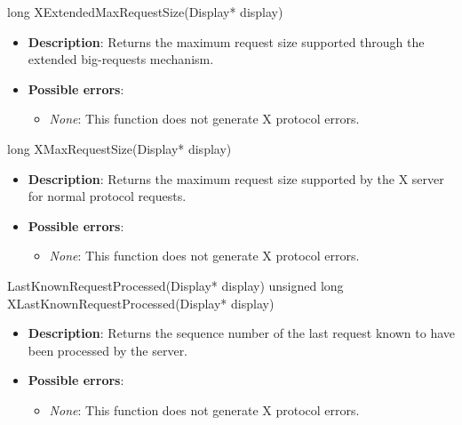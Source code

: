 \documentclass{report}
\begin{document}
\begin{itemize}
        \begin{cppcode}
            long XExtendedMaxRequestSize(Display* display)
        \end{cppcode}
        \begin{itemize}
            \item \textbf{Description}: Returns the maximum request size supported through the extended big-requests mechanism.
            \item \textbf{Possible errors}:
                \begin{itemize}
                    \item \textit{None}: This function does not generate X protocol errors.
                \end{itemize}
        \end{itemize}

        \begin{cppcode}
            long XMaxRequestSize(Display* display)
        \end{cppcode}
        \begin{itemize}
            \item \textbf{Description}: Returns the maximum request size supported by the X server for normal protocol requests.
            \item \textbf{Possible errors}:
                \begin{itemize}
                    \item \textit{None}: This function does not generate X protocol errors.
                \end{itemize}
        \end{itemize}

        \begin{cppcode}
            LastKnownRequestProcessed(Display* display)
            unsigned long XLastKnownRequestProcessed(Display* display)
        \end{cppcode}
        \begin{itemize}
            \item \textbf{Description}: Returns the sequence number of the last request known to have been processed by the server.
            \item \textbf{Possible errors}:
                \begin{itemize}
                    \item \textit{None}: This function does not generate X protocol errors.
                \end{itemize}
        \end{itemize}


\end{itemize}
\end{document}
